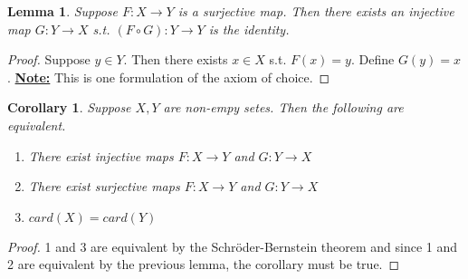 \documentclass[12pt,letterpaper]{article}
\newtheorem{lemma}{Lemma}
\newtheorem{cor}{Corollary}
\begin{document}
\begin{lemma}
Suppose $F:X\to Y$ is a surjective map. Then there exists an injective map $G: Y\to X$ s.t. $(F \circ G): Y\to Y$ is the identity.
\end{lemma}
\begin{proof}
Suppose $y\in Y$. Then there exists $x \in X$ s.t. $F(x)=y$. Define $G(y)=x$. \newline \underline{\textbf{Note:}} This is one formulation of the axiom of choice.
\end{proof}
\begin{cor}
Suppose $X,Y$ are non-empy setes. Then the following are equivalent.
\begin{enumerate}
\item There exist injective maps $F: X\to Y$ and $G: Y\to X$
\item There exist surjective maps $F: X\to Y$ and $G: Y\to X$
\item $card(X)=card(Y)$
\end{enumerate}
\end{cor}
\begin{proof}
1 and 3 are equivalent by the Schr\"{o}der-Bernstein theorem and since 1 and 2 are equivalent by the previous lemma, the corollary must be true.
\end{proof}
\end{document}
